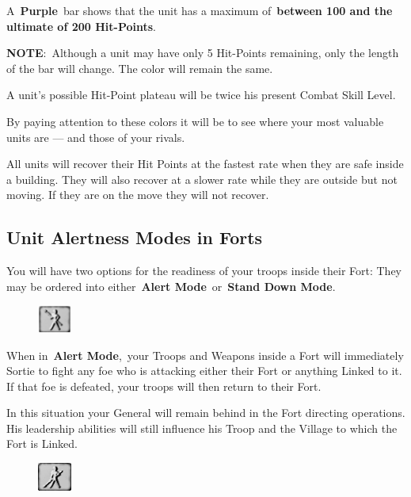 A \textbf{Purple} bar shows that the unit has a maximum of \textbf{between 100 and the ultimate of 200 Hit-Points}.

\textbf{NOTE}: Although a unit may have only 5 Hit-Points remaining, only the length of the bar will change. The color will remain the same.

A unit’s possible Hit-Point plateau will be twice his present Combat Skill Level.

By paying attention to these colors it will be to see where your most valuable units are --- and those of your rivals.

All units will recover their Hit Points at the fastest rate when they are safe inside a building. They will also recover at a slower rate while they are outside but not moving. If they are on the move they will not recover.

\subsection{Unit Alertness Modes in Forts}

 You will have two options for the readiness of your troops inside their Fort: They may be ordered into either \textbf{Alert Mode} or \textbf{Stand Down Mode}.

\begin{figure}
	\vspace{-20pt}
	\begin{center}
		\includegraphics[width=0.1\textwidth]{Talert}
	\end{center}
	\vspace{-20pt}
\end{figure}

When in \textbf{Alert Mode}, your Troops and Weapons inside a Fort will immediately Sortie to fight any foe who is attacking either their Fort or anything Linked to it. If that foe is defeated, your troops will then return to their Fort.

In this situation your General will remain behind in the Fort directing operations. His leadership abilities will still influence his Troop and the Village to which the Fort is Linked.

\begin{figure}
	\vspace{-20pt}
	\begin{center}
		\includegraphics[width=0.1\textwidth]{Tstanddown}
	\end{center}
	\vspace{-20pt}
\end{figure}


